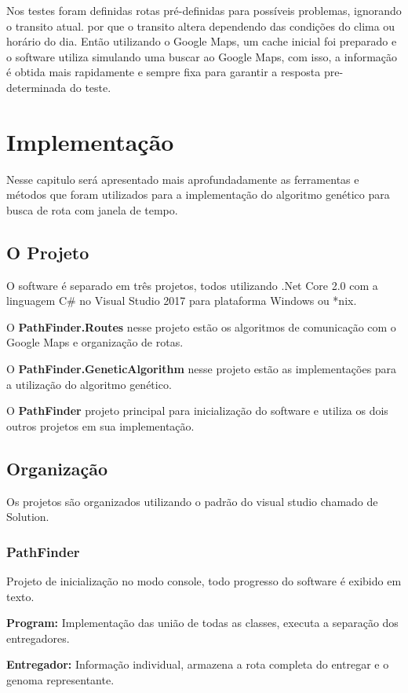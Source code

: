 Nos testes foram definidas rotas pré-definidas para possíveis problemas, ignorando o transito atual. por que o transito altera dependendo das condições do clima ou horário do dia. Então utilizando o Google Maps, um cache inicial foi preparado e o software utiliza simulando uma buscar ao Google Maps, com isso, a informação é obtida mais rapidamente e sempre fixa para garantir a resposta pre-determinada do teste.

\chapter{Implementação}
 
Nesse capitulo será apresentado mais aprofundadamente as ferramentas e métodos que foram utilizados para a implementação do algoritmo genético para busca de rota com janela de tempo.
 
\section{O Projeto}
O software é separado em três projetos, todos utilizando .Net Core 2.0 com a linguagem C\# no Visual Studio 2017 para plataforma Windows ou \**nix.

O \textbf{PathFinder.Routes} nesse projeto estão os algoritmos de comunicação com o Google Maps e organização de rotas.

O \textbf{PathFinder.GeneticAlgorithm} nesse projeto estão as implementações para a utilização do algoritmo genético.

O \textbf{PathFinder} projeto principal para inicialização do software e utiliza os dois outros projetos em sua implementação.

\section{Organização}
Os projetos são organizados utilizando o padrão do visual studio chamado de Solution.

\subsection{PathFinder}
Projeto de inicialização no modo console, todo progresso do software é exibido em texto.

\textbf{Program:} Implementação das união de todas as classes, executa a separação dos entregadores.

\textbf{Entregador:} Informação individual, armazena a rota completa do entregar e o genoma representante.

